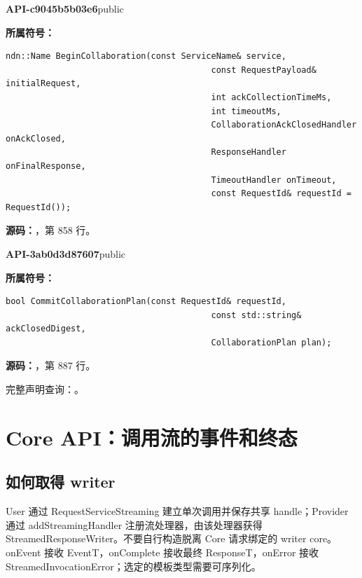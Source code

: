 \textbf{API-c9045b5b03e6}\quad public\par
\textbf{所属符号：}\par
\begin{Verbatim}[fontsize=\footnotesize,breaklines,breakanywhere]
ndn::Name BeginCollaboration(const ServiceName& service,
                                         const RequestPayload& initialRequest,
                                         int ackCollectionTimeMs,
                                         int timeoutMs,
                                         CollaborationAckClosedHandler onAckClosed,
                                         ResponseHandler onFinalResponse,
                                         TimeoutHandler onTimeout,
                                         const RequestId& requestId = RequestId());
\end{Verbatim}
\textbf{源码：}，第 858 行。\par

\textbf{API-3ab0d3d87607}\quad public\par
\textbf{所属符号：}\par
\begin{Verbatim}[fontsize=\footnotesize,breaklines,breakanywhere]
bool CommitCollaborationPlan(const RequestId& requestId,
                                         const std::string& ackClosedDigest,
                                         CollaborationPlan plan);
\end{Verbatim}
\textbf{源码：}，第 887 行。\par

完整声明查询：。

\section{Core API：调用流的事件和终态}

\subsection{如何取得 writer}
User 通过 RequestServiceStreaming 建立单次调用并保存共享 handle；Provider 通过 addStreamingHandler 注册流处理器，由该处理器获得 StreamedResponseWriter。不要自行构造脱离 Core 请求绑定的 writer core。onEvent 接收 EventT，onComplete 接收最终 ResponseT，onError 接收 StreamedInvocationError；选定的模板类型需要可序列化。

